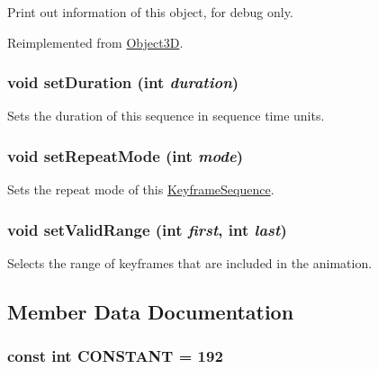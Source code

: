 Print out information of this object, for debug only. 

Reimplemented from \hyperlink{classm3g_1_1Object3D_6fea17fa1532df3794f8cb39cb4f911f}{Object3D}.\hypertarget{classm3g_1_1KeyframeSequence_d7406d5e0e2f398e05e3563d099dfdf1}{
\subsubsection[{setDuration}]{\setlength{\rightskip}{0pt plus 5cm}void setDuration (int {\em duration})}}
\label{classm3g_1_1KeyframeSequence_d7406d5e0e2f398e05e3563d099dfdf1}


Sets the duration of this sequence in sequence time units. \hypertarget{classm3g_1_1KeyframeSequence_e5cd1486fe0a8a61cf96816e976d7f87}{
\subsubsection[{setRepeatMode}]{\setlength{\rightskip}{0pt plus 5cm}void setRepeatMode (int {\em mode})}}
\label{classm3g_1_1KeyframeSequence_e5cd1486fe0a8a61cf96816e976d7f87}


Sets the repeat mode of this \hyperlink{classm3g_1_1KeyframeSequence}{KeyframeSequence}. \hypertarget{classm3g_1_1KeyframeSequence_b5a824131cef547816366141afe0339a}{
\subsubsection[{setValidRange}]{\setlength{\rightskip}{0pt plus 5cm}void setValidRange (int {\em first}, \/  int {\em last})}}
\label{classm3g_1_1KeyframeSequence_b5a824131cef547816366141afe0339a}


Selects the range of keyframes that are included in the animation. 

\subsection{Member Data Documentation}
\hypertarget{classm3g_1_1KeyframeSequence_b45ff833865ae8962be27923995f91a3}{
\subsubsection[{CONSTANT}]{\setlength{\rightskip}{0pt plus 5cm}const int {\bf CONSTANT} = 192}}
\label{classm3g_1_1KeyframeSequence_b45ff833865ae8962be27923995f91a3}


